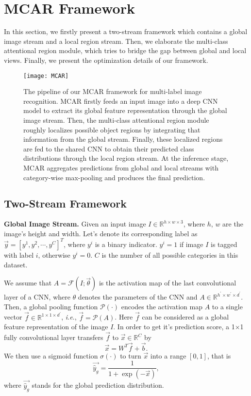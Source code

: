 \documentclass[journal]{IEEEtran}
\makeatletter
\DeclareRobustCommand\onedot{\@onedot}
\def\@onedot{.}
\def\ie{\emph{i.e}\onedot}
\makeatother
\begin{document}
\section{MCAR Framework}\label{mcarf}
In this section, we firstly present a two-stream framework which contains a global image stream and a local region stream. Then, we elaborate the multi-class attentional region module, which tries to bridge the gap between global and local views. Finally, we present the optimization details of our framework.

\begin{figure*}[t]
 \centering
 {\texttt{[image: MCAR]}}
\caption{The pipeline of our MCAR framework for multi-label image recognition. MCAR firstly feeds an input image into a deep CNN model to extract its global feature representation through the global image stream. Then, the multi-class attentional region module roughly localizes possible object regions by integrating that information from the global stream. Finally, these localized regions are fed to the shared CNN to obtain their predicted class distributions through the local region stream. At the inference stage, MCAR aggregates predictions from global and local streams with category-wise max-pooling and produces the final prediction.}\label{fig:pipeline}
\end{figure*}

\subsection{Two-Stream Framework}
\noindent \textbf{Global Image Stream.}  
Given an input image $I \in \mathbb{R}^{h\times w\times 3}$, where $h$, $w$ are the image's height and width. Let's denote its corresponding label as $\vec y={[y^1, y^2, \cdots, y^C]}^T$, where $y^i$ is a binary indicator. $y^i=1$ if image $I$ is tagged with label $i$, otherwise $y^i=0$. $C$ is the number of all possible categories in this dataset.
 
We assume that $A ={\mathcal F} (I; \vec \theta)$ is the activation map of the last convolutional layer of a CNN, where $\theta$ denotes the parameters of the CNN and $A \in \mathbb{R}^{h^\prime \times w^\prime \times d^\prime}$. Then, a global pooling function $\mathcal {P}(\cdot)$ encodes the activation map $A$ to a single vector $\vec f \in \mathbb{R}^{ 1 \times 1\times d^\prime}$, \ie, $ \vec f = \mathcal {P}(A) $. Here $\vec f$ can be considered as a global feature representation of the image $I$. In order to get it's prediction score, a 1$\times$1 fully convolutional layer transfers $\vec f$ to $\vec x \in \mathbb{R}^{C}$ by
 \begin{equation}\label{eq:linear}
 \vec x =  W^T\vec f +  \vec b.
 \end{equation}
 We then use a sigmoid function $\sigma(\cdot)$ to turn $\vec x$ into a range $[0,1]$, that is 
 \begin{equation}\label{eq:sigmoid}
 \vec {\hat {y}_g} = \frac {1}{1+\exp(-\vec x)},
 \end{equation}
 where $\vec {\hat{y}_g}$ stands for the global prediction distribution.
 
\end{document}
